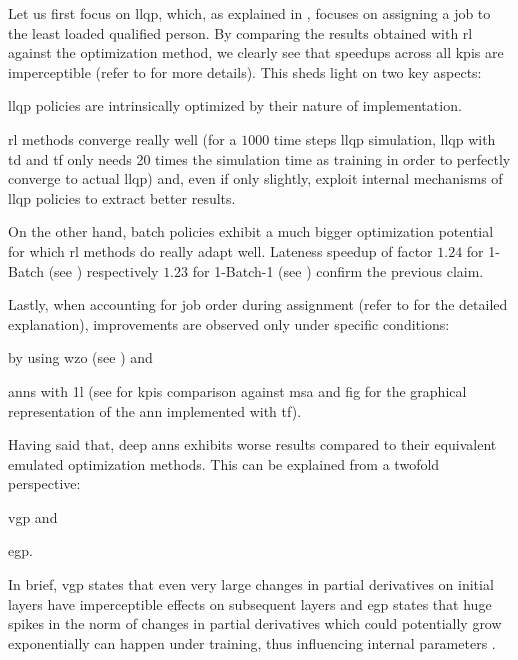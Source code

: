 \documentclass[draft=false]{seal_thesis}
\begin{document}
Let us first focus on \gls{llqp}, which, as explained in , focuses on assigning a job to the least loaded qualified person. By comparing the results obtained with \gls{rl} against the optimization method, we clearly see that speedups across all \glspl{kpi} are imperceptible (refer to  for more details). This sheds light on two key aspects:
\begin{enumerate*}
	\item \gls{llqp} policies are intrinsically optimized by their nature of implementation.
	\item \gls{rl} methods converge really well (for a $1000$ time steps \gls{llqp} simulation, \gls{llqp} with \gls{td} and \gls{tf} only needs 20 times the simulation time as training in order to perfectly converge to actual \gls{llqp}) and, even if only slightly, exploit internal mechanisms of \gls{llqp} policies to extract better results.
\end{enumerate*}

On the other hand, batch policies exhibit a much bigger optimization potential for which \gls{rl} methods do really adapt well. Lateness speedup of factor $1.24$ for 1-Batch (see ) respectively $1.23$ for 1-Batch-1 (see ) confirm the previous claim.

Lastly, when accounting for job order during assignment (refer to  for the detailed explanation), improvements are observed only under specific conditions:
\begin{enumerate*}
	\item by using \gls{wzo} (see ) and 
	\item \glspl{ann} with \gls{1l} (see  for \glspl{kpi} comparison against \gls{msa} and fig for the graphical representation of the \gls{ann} implemented with \gls{tf}).
\end{enumerate*}

Having said that, deep \glspl{ann} exhibits worse results compared to their equivalent emulated optimization methods. This can be explained from a twofold perspective:
\begin{enumerate*}
	\item \gls{vgp} and
	\item \gls{egp}.
\end{enumerate*}

In brief, \gls{vgp} states that even very large changes in partial derivatives on initial layers have imperceptible effects on subsequent layers \citep{Bengio1994} and \gls{egp} states that huge spikes in the norm of changes in partial derivatives which could potentially grow exponentially can happen under training, thus influencing internal parameters \citep{Bengio1994,Pascanu2012}.
\end{document}
